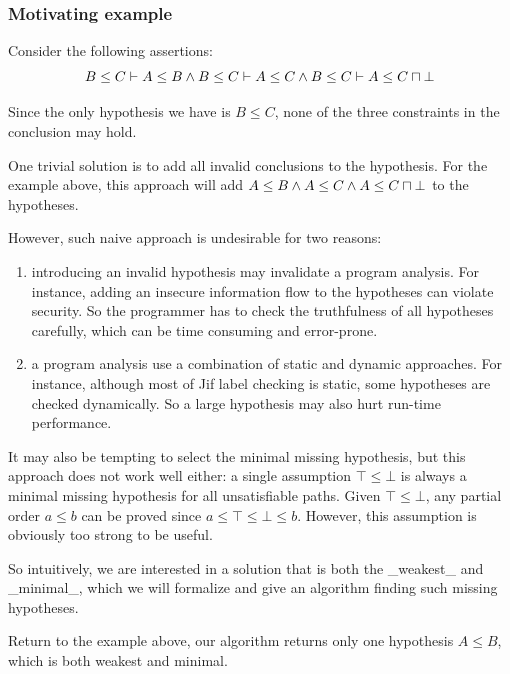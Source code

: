 \subsubsection{Motivating example}

Consider the following assertions: 
%
\[B\leq C \vdash A\leq B \land B\leq C \vdash A\leq C \land B\leq C
\vdash A\leq C\sqcap \bot \]

Since the only hypothesis we have is $B\leq C$, none of the three
constraints in the conclusion may hold. 

One trivial solution is to add all invalid conclusions to the
hypothesis. For the example above, this approach will add $A\leq B
\land A\leq C \land A\leq C\sqcap \bot$ to the hypotheses.

However, such naive approach is undesirable for two reasons: 
%
\begin{enumerate}
\item introducing an invalid hypothesis may invalidate a program
analysis. For instance, adding an insecure information flow to the
hypotheses can violate security. So the programmer has to check
the truthfulness of all hypotheses carefully, which can be time
consuming and error-prone.

\item a program analysis use a combination of static and dynamic
approaches. For instance, although most of Jif label checking is
static, some hypotheses are checked dynamically. So a large hypothesis
may also hurt run-time performance.
\end{enumerate}

It may also be tempting to select the minimal missing hypothesis,
but this approach does not work well either: a single assumption
$\top\leq \bot$ is always a minimal missing hypothesis for all
unsatisfiable paths. Given $\top\leq \bot$, any
partial order $a \leq b$ can be proved since $a\leq \top\leq \bot\leq
b$. However, this assumption is obviously too strong to be useful.

So intuitively, we are interested in a solution that is both the
_weakest_ and _minimal_, which we will formalize and give an algorithm
finding such missing hypotheses. 

Return to the example above, our algorithm returns only one hypothesis
$A\leq B$, which is both weakest and minimal.
%
% 
% 
% 
% 
